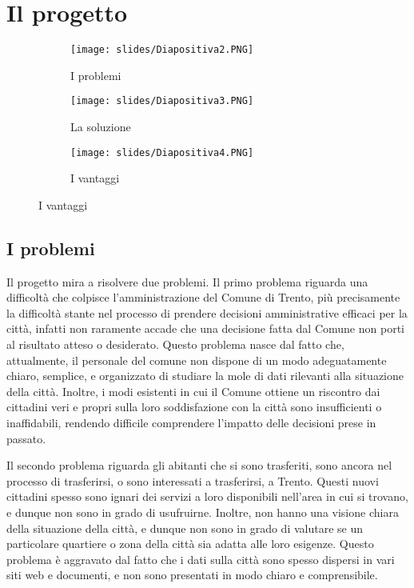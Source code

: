 \chapter{Il progetto \ProjectTitle}
\thispagestyle{stdPage}
\begin{figure}[H]
    \begin{subfigure}{0.33\textwidth}
        \texttt{[image: slides/Diapositiva2.PNG]}
        \caption{I problemi}
    \end{subfigure}
    \begin{subfigure}{0.33\textwidth}
        \texttt{[image: slides/Diapositiva3.PNG]}
        \caption{La soluzione}
    \end{subfigure}
    \begin{subfigure}{0.33\textwidth}
        \texttt{[image: slides/Diapositiva4.PNG]}
        \caption{I vantaggi}
    \end{subfigure}
\end{figure}

\section{I problemi}
    Il progetto mira a risolvere due problemi. Il primo problema riguarda una difficoltà che colpisce l'amministrazione del Comune di Trento, più precisamente la difficoltà stante nel processo di prendere decisioni amministrative efficaci per la città, infatti non raramente accade che una decisione fatta dal Comune non porti al risultato atteso o desiderato. Questo problema nasce dal fatto che, attualmente, il personale del comune non dispone di un modo adeguatamente chiaro, semplice, e organizzato di studiare la mole di dati rilevanti alla situazione della città. Inoltre, i modi esistenti in cui il Comune ottiene un riscontro dai cittadini veri e propri sulla loro soddisfazione con la città sono insufficienti o inaffidabili, rendendo difficile comprendere l'impatto delle decisioni prese in passato. 
    
    Il secondo problema riguarda gli abitanti che si sono trasferiti, sono ancora nel processo di trasferirsi, o sono interessati a trasferirsi, a Trento. Questi nuovi cittadini spesso sono ignari dei servizi a loro disponibili nell'area in cui si trovano, e dunque non sono in grado di usufruirne. Inoltre, non hanno una visione chiara della situazione della città, e dunque non sono in grado di valutare se un particolare quartiere o zona della città sia adatta alle loro esigenze. Questo problema è aggravato dal fatto che i dati sulla città sono spesso dispersi in vari siti web e documenti, e non sono presentati in modo chiaro e comprensibile.

